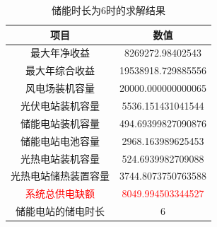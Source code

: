 \documentclass{article}
\begin{document}
\begin{table}[H]
    \centering
    \caption{储能时长为6时的求解结果}
    \label{tab:energy_system_data_6}
    \begin{tabular}{c|c}
        \toprule
        \textbf{项目} & \textbf{数值} \\
        \midrule
        最大年净收益 & 8269272.98402543 \\
        最大年综合收益 & 19538918.729885556 \\
        风电场装机容量 & 20000.000000000065 \\
        光伏电站装机容量 & 5536.151431041544 \\
        储能电站装机容量 & 494.69399827090876 \\
        储能电站电池容量 & 2968.163989625453 \\
        光热电站装机容量 & 524.6939982709088 \\
        光热电站储热装置容量 & 3744.8073750763588 \\
        \textcolor{red}{系统总供电缺额} & \textcolor{red}{8049.994503344527} \\
        储能电站的储电时长 & 6 \\
        \bottomrule
    \end{tabular}
\end{table}
\end{document}
